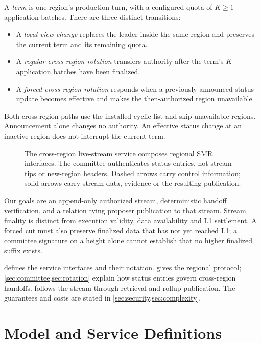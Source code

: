 \documentclass[11pt,a4paper,onecolumn]{article}
\newcounter{protocol}
\begin{document}
A \emph{term} is one region's production turn, with a configured quota
of $K\geq1$ application batches. There are three distinct transitions:
\begin{itemize}
\item A \emph{local view change} replaces the leader inside the same region
and preserves the current term and its remaining quota.
\item A \emph{regular cross-region rotation} transfers authority after
the term's $K$ application batches have been finalized.
\item A \emph{forced cross-region rotation} responds when a previously
announced status update becomes effective and makes the then-authorized
region unavailable.
\end{itemize}
Both cross-region paths use the installed cyclic list and skip unavailable
regions. Announcement alone changes no authority. An effective status
change at an inactive region does not interrupt the current term.

\begin{figure}[htbp]\centering

\caption{The cross-region live-stream service composes regional SMR
interfaces. The committee authenticates status entries, not stream tips or
new-region headers. Dashed arrows carry control information; solid arrows
carry stream data, evidence or the resulting publication.}
\label{fig:architecture}
\end{figure}

Our goals are an append-only authorized stream, deterministic handoff
verification, and a relation tying proposer publication to that stream.
Stream finality is distinct from execution validity, data availability
and L1 settlement. A forced cut must also preserve finalized data that has
not yet reached L1; a committee signature on a height alone cannot establish
that no higher finalized suffix exists.

 defines the service interfaces and their notation.
 gives the regional protocol; \cref{sec:committee,sec:rotation}
explain how status entries govern cross-region handoffs.
 follows the stream through retrieval and rollup
publication. The guarantees and costs are stated in
\cref{sec:security,sec:complexity}.

\section{Model and Service Definitions}\label{sec:model}
\end{document}
